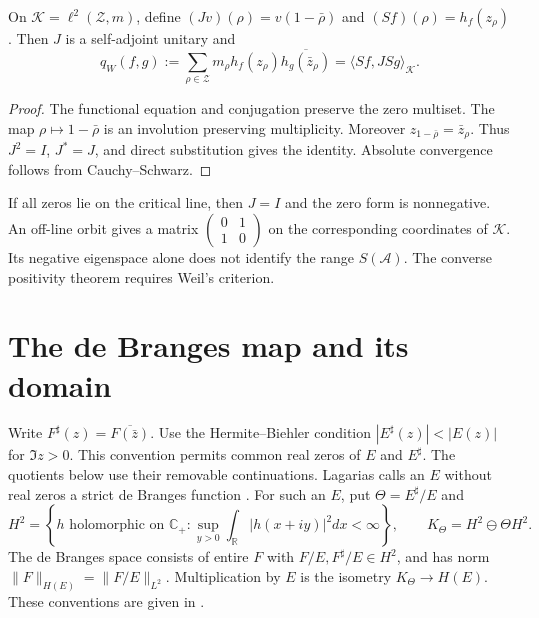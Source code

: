 \documentclass[11pt]{article}
\begin{document}
\begin{proposition}\label{prop:zero-involution}
On $\mathcal K=\ell^2(\mathcal Z,m)$, define
$(Jv)(\rho)=v(1-\bar\rho)$ and $(Sf)(\rho)=h_f(z_\rho)$.
Then $J$ is a self-adjoint unitary and
\begin{equation}\label{eq:zero-pairing}
 q_W(f,g):=\sum_{\rho\in\mathcal Z}m_\rho
 h_f(z_\rho)\overline{h_g(\bar z_\rho)}
       =\langle Sf,J Sg\rangle_{\mathcal K}.
\end{equation}
\end{proposition}
\begin{proof}
The functional equation and conjugation preserve the zero multiset.
The map $\rho\mapsto1-\bar\rho$ is an involution preserving multiplicity.
Moreover $z_{1-\bar\rho}=\bar z_\rho$.
Thus $J^2=I$, $J^*=J$, and direct substitution gives the identity.
Absolute convergence follows from Cauchy--Schwarz.
\end{proof}

If all zeros lie on the critical line, then $J=I$ and the zero form is nonnegative.
An off-line orbit gives a matrix $\left(\begin{smallmatrix}0&1\\1&0\end{smallmatrix}\right)$
on the corresponding coordinates of $\mathcal K$.
Its negative eigenspace alone does not identify the range $S(\mathscr A)$.
The converse positivity theorem requires Weil's criterion.

\section{The de Branges map and its domain}

Write $F^\sharp(z)=\overline{F(\bar z)}$.
Use the Hermite--Biehler condition $|E^\sharp(z)|<|E(z)|$ for $\Im z>0$.
This convention permits common real zeros of $E$ and $E^\sharp$.
The quotients below use their removable continuations.
Lagarias calls an $E$ without real zeros a strict de Branges function
\cite[Section~2, pp.~2--4]{lagarias}.
For such an $E$, put $\Theta=E^\sharp/E$ and
\[
 H^2=\left\{h\text{ holomorphic on }\mathbb C_+:
      \sup_{y>0}\int_{\mathbb R}|h(x+iy)|^2dx<\infty\right\},
 \qquad K_\Theta=H^2\ominus\Theta H^2.
\]
The de Branges space consists of entire $F$ with $F/E,F^\sharp/E\in H^2$,
and has norm $\|F\|_{H(E)}=\|F/E\|_{L^2}$.
Multiplication by $E$ is the isometry $K_\Theta\to H(E)$.
These conventions are given in \cite[Sections~2.3--2.4]{suzuki}.
\end{document}
